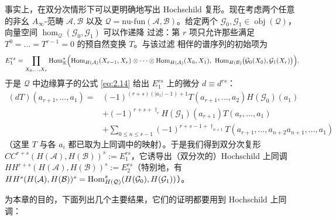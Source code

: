 事实上，在双分次情形下可以更明确地写出 Hochschild 复形。现在考虑两个任意的非幺
$A_\infty$-范畴 $\mathcal A,\mathcal B$ 以及 $\mathcal Q=\mathrm{nu\text{-}fun}
(\mathcal A,\mathcal B)$。给定两个 $\mathcal G_0,\mathcal G_1\in\operatorname{obj}
(\mathcal Q)$，向量空间 $\hom_{\mathcal Q}(\mathcal G_0,\mathcal G_1)$ 可以作递降
过滤：第 $r$ 项只允许那些满足 $T^0=\dots=T^{r-1}=0$ 的预自然变换 $T$。与该过滤
相伴的谱序列的初始项为
\begin{equation}\label{eq:2.21}
  E_1^{rs}=\prod_{X_0,\dots,X_r}\operatorname{Hom}^s_{\mathbb K}\Bigl(
  \operatorname{Hom}_{H(\mathcal A)}(X_{r-1},X_r)\otimes\dots\otimes
  \operatorname{Hom}_{H(\mathcal A)}(X_0,X_1),\ \operatorname{Hom}_{H(\mathcal B)}\bigl(\mathcal G_0(X_0),
  \mathcal G_1(X_r)\bigr)\Bigr).
\end{equation}
于是 $\mathcal Q$ 中边缘算子的公式 \eqref{eq:2.14} 给出 $E_1^{rs}$ 上的微分
$d\equiv d^{rs}$：
\[
  \begin{aligned}
    (dT)(a_{r+1},\dots,a_1)={}&(-1)^{(r+s)(|a_1|-1)+1}T(a_{r+1},\dots,a_2)
    H(\mathcal G_0)(a_1)\\
    &+(-1)^{r+s+\dagger_r}H(\mathcal G_1)(a_{r+1})T(a_r,\dots,a_1)\\
    &+\sum_{0\le n\le r-1}(-1)^{r+s-1+\dagger_{n+1}}
    T(a_{r+1},\dots,a_{n+2}a_{n+1},\dots,a_1)
  \end{aligned}
\]
（这里 $T$ 与各 $a_i$ 都已取为上同调中的映射）。于是我们得到双分次复形
$CC^{r+s}(H(\mathcal A),H(\mathcal B))^s:=E_1^{rs}$，它诱导出（双分次的）Hochschild
上同调 $HH^{r+s}(H(\mathcal A),H(\mathcal B))^s:=E_2^{rs}$（特别地，有
$HH^s(H(\mathcal A),H(\mathcal B))^s=\operatorname{Hom}^s_{H(\mathcal Q)}(H(\mathcal G_0),
H(\mathcal G_1))$）。

为本章的目的，下面列出几个主要结果，它们的证明都要用到 Hochschild 上同调：

